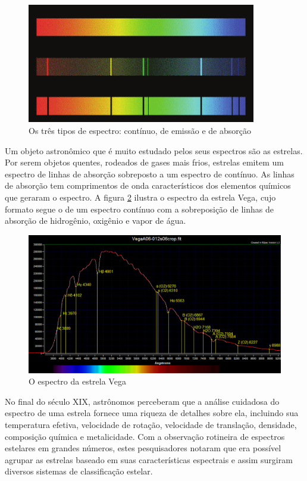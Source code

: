 \begin{figure}[htb]
\centering
\includegraphics[width=10cm]{figuras/Continuous-spectrum-and-two-types-of-line-spectra.png}
\caption{Os três tipos de espectro: contínuo, de emissão e de absorção \citep{mcgrawhill}}
\label{fig:spectrum-types}
\end{figure}

Um objeto astronômico que é muito estudado pelos seus espectros são as estrelas. Por serem objetos quentes, rodeados de gases mais frios, estrelas emitem um espectro de linhas de absorção sobreposto a um espectro de contínuo. As linhas de absorção tem comprimentos de onda característicos dos elementos químicos que geraram o espectro. A figura \ref{fig:vega-spectrum} ilustra o espectro da estrela Vega, cujo formato segue o de um espectro contínuo com a sobreposição de linhas de absorção de hidrogênio, oxigênio e vapor de água.

\begin{figure}[htb]
\centering
\includegraphics[width=12cm]{figuras/vega_spectrum.jpg}
\caption{O espectro da estrela Vega\citep{vega-spectrum}}
\label{fig:vega-spectrum}
\end{figure}

No final do século XIX, astrônomos perceberam que a análise cuidadosa do espectro de uma estrela fornece uma riqueza de detalhes sobre ela, incluindo sua temperatura efetiva, velocidade de rotação, velocidade de translação, densidade, composição química e metalicidade. Com a observação rotineira de espectros estelares em grandes números, estes pesquisadores notaram que era possível agrupar as estrelas baseado em suas características espectrais e assim surgiram diversos sistemas de classificação estelar. 


